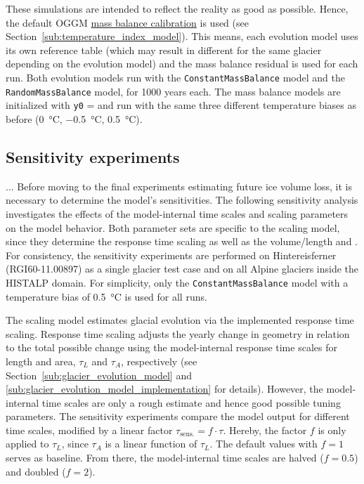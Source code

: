         These simulations are intended to reflect the reality as good as possible. Hence, the default OGGM \hyperref[ssub:mb_calib]{mass balance calibration} is used (see Section~\ref{sub:temperature_index_model}). This means, each evolution model uses its own \tstar{} reference table (which may result in different \tstar{} for the same glacier depending on the evolution model) and the mass balance residual \bias{} is used for each run. Both evolution models run with the \lstinline`ConstantMassBalance` model and the \lstinline`RandomMassBalance` model, for 1000 years each. The mass balance models are initialized with \lstinline`y0` = \tstar{} and run with the same three different temperature biases as before (\SI{0}{\celsius}, \SI{-0.5}{\celsius}, \SI{+0.5}{\celsius}).
    

    \subsection{Sensitivity experiments} %
    \label{sub:sensitivity_experiments_setup}
        ... Before moving to the final experiments estimating future ice volume loss, it is necessary to determine the model's sensitivities. The following sensitivity analysis investigates the effects of the model-internal time scales and scaling parameters on the model behavior. Both parameter sets are specific to the scaling model, since they determine the response time scaling as well as the volume/length and \vas{}. For consistency, the sensitivity experiments are performed on Hintereisferner (RGI60-11.00897) as a single glacier test case and on all Alpine glaciers inside the HISTALP domain. For simplicity, only the \lstinline`ConstantMassBalance` model with a temperature bias of \SI{+0.5}{\celsius} is used for all runs.

        The scaling model estimates glacial evolution via the implemented response time scaling. Response time scaling adjusts the yearly change in geometry in relation to the total possible change using the model-internal response time scales for length and area, $\tau_L$ and  $\tau_A$, respectively (see Section~\ref{sub:glacier_evolution_model} and \ref{sub:glacier_evolution_model_implementation} for details).
        However, the model-internal time scales are only a rough estimate and hence good possible tuning parameters. The sensitivity experiments compare the model output for different time scales, modified by a linear factor $\tau_\text{sens.} = f \cdot \tau$. Hereby, the factor $f$ is only applied to $\tau_L$, since $\tau_A$ is a linear function of $\tau_L$. The default values with $f=1$ serves as baseline. From there, the model-internal time scales are halved ($f=0.5$) and doubled ($f=2$). 

